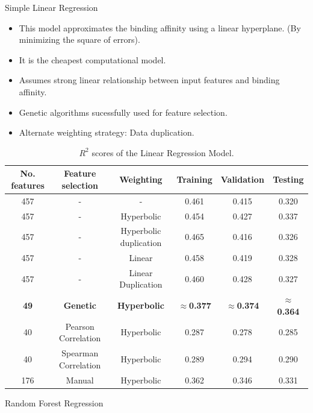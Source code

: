 \documentclass{beamer}
\begin{document}
\begin{frame}[t]{Simple Linear Regression}
\begin{itemize}
\item This model approximates the binding affinity using a linear hyperplane.  (By minimizing the square of errors).
\item It is the cheapest computational model.
\item Assumes strong linear relationship between input features and binding affinity.
\item Genetic algorithms sucessfully used for feature selection.
\item Alternate weighting strategy: Data duplication.
\end{itemize}

\begin{table} [h!]
\centering
\resizebox{0.75\linewidth}{!} {
\begin{tabular}{ | c | c | c | c | c | c | }
\hline
\textbf{No.  features} & \textbf{Feature selection} & \textbf{Weighting} & \textbf{Training} & \textbf{Validation} & \textbf{Testing} \\ [0.5 ex]
\hline \hline
457 & - & - & 0.461 & 0.415 & 0.320\\
457 &  - & Hyperbolic & 0.454 & 0.427 & 0.337\\
457 & - & Hyperbolic duplication & 0.465 & 0.416 & 0.326\\
457 & - & Linear & 0.458 & 0.419 & 0.328\\
457 & - & Linear Duplication & 0.460 & 0.428 & 0.327\\
\textbf{49} & \textbf{Genetic} & \textbf{Hyperbolic} & \textbf{$\approx$0.377} & \textbf{$\approx$0.374}  & \textbf{$\approx$0.364}\\
40 & Pearson Correlation & Hyperbolic & 0.287 & 0.278  & 0.285 \\ 
40 & Spearman Correlation & Hyperbolic & 0.289 & 0.294  & 0.290 \\ 
176 & Manual & Hyperbolic & 0.362  & 0.346  & 0.331\\ [1ex]
\hline
\end{tabular}
}
\caption{$R^2$ scores of the Linear Regression Model.}
\label {table:1}
\end{table}

\end{frame}

\begin{frame}[t]{Random Forest Regression}

\end{frame}
\end{document}
